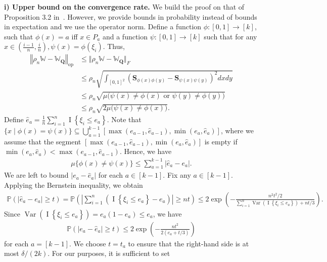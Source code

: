 \documentclass[11pt]{article}
\renewcommand{\P}{\mathbb{P}}
\newcommand{\op}{\mathrm{op}}
\newcommand{\bQ}{\bm{Q}}
\newcommand{\bbW}{\mathbb{W}}
\newcommand{\Var}{\operatorname{Var}}
\newcommand{\bS}{\bm{S}}
\newcommand{\indicator}[1]{{\operatorname{I} \left \{ #1\right \}}}
\newcommand{\<}{\langle}
\renewcommand{\>}{\rangle}
\theoremstyle{plain}
\theoremstyle{definition}
\theoremstyle{remark}
\begin{document}
{\textbf{i) Upper bound on the convergence rate.} 
We build the proof on that of Proposition 3.2 in~\citep{klopp2017}. However, we provide bounds in probability instead of bounds in expectation and we use the operator norm.
Define a function $\phi: [0, 1] \to [k]$, such that $\phi(x) = a$ iff $x \in P_a$ and a function $\psi: [0, 1] \to [k]$ such that for any $x\in \left(\frac{i-1}{n},\frac{i}{n}\right), \psi(x)=\phi(\xi_{i})$. 
Thus,
\begin{align*}
	\left\Vert  \rho_n \bbW - {\bbW}_{\bQ} \right\Vert_{\op}& \le \Vert  \rho_n \bbW - {\bbW}_{\bQ} \Vert_{F} \\
 & \le \rho_n \sqrt{\int_{[0,1]^2} (\bS_{\phi(x)\phi(y)} - \bS_{\psi(x)\psi(y)})^2 dx dy} \\
	& \le \rho_n \sqrt{\mu \bigl (\psi(x) \neq \phi(x) \text{ or } \psi(y) \neq \phi(y) \bigr )} \\
	& \le \rho_n \sqrt{2 \mu \bigl (\psi(x) \neq \phi(x) \bigr )}.
\end{align*}
Define $\widehat{e}_a = \frac{1}{n} \sum_{i = 1}^n \indicator{\xi_i \le e_a}.$
Note that $\{x \mid \phi(x) = \psi(x)\} \subseteq \bigcup_{a = 1}^{k - 1} [\max(e_{a - 1},\hat{e}_{a - 1}), \min(e_{a},\hat{e}_a)]$, where we assume that the segment \newline $[\max(e_{a - 1},\hat{e}_{a - 1}), \min(e_{a},\hat{e}_a)]$ is empty if $\min(e_{a}, \hat{e}_a) < \max(e_{a - 1}, \hat{e}_{a - 1})$. Hence, we have
\begin{align*}
    \mu\{\phi(x) \neq \psi(x)\} \le \sum_{a = 1}^{k - 1} |\widehat{e}_a - e_a|.
\end{align*}
We are left to bound $|e_a - \widehat{e}_a|$ for each $a \in [k-1]$. Fix any $a \in [k-1]$. Applying the Bernstein inequality, we obtain
\begin{align*}
        \P \left (\left |\widehat e_a - e_a \right| \ge t \right ) = \P \left( \left| \sum_{i = 1}^n (\indicator{\xi_i \le e_a} - e_a) \right| \ge n t\right) \le 2 \exp \left( - \frac{n^2 t^2 / 2}{\sum_{i = 1}^n  \Var(\indicator{\xi_i \le e_a})  + n t/3}\right ). 
\end{align*}
Since $\Var(\indicator{\xi_i \le e_a}) =  e_a(1 - e_a) \leq e_a$, we have
\begin{align*}
    \P \left(|e_a - \widehat e_a | \ge t \right ) \le 2 \exp \left( - \frac{n t^2}{2(e_a + t/3)}\right )
\end{align*}
for each $a = [k - 1]$. We choose $t = t_a$ to ensure that the right-hand side is at most $\delta/(2 k)$. For our purposes, it is sufficient to set
}
\end{document}
